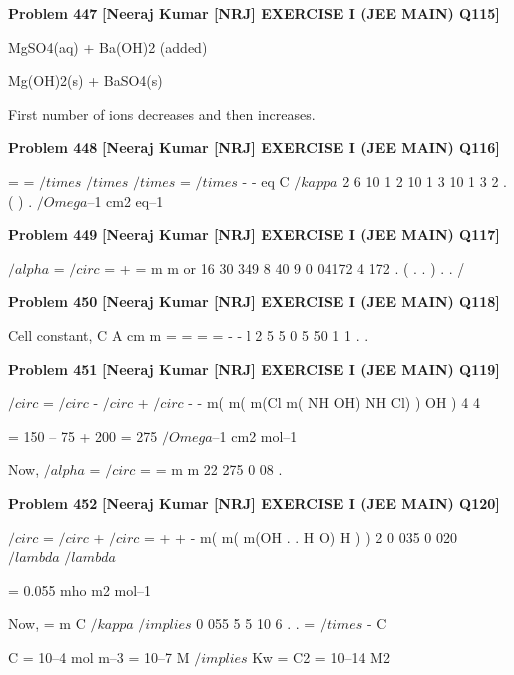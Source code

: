 \begin{problembox}
\textbf{Problem 447} \hfill \textbf{[Neeraj Kumar [NRJ] EXERCISE I (JEE MAIN) Q115]}
\label{q:ext-nrj_all_questions-447}

MgSO4(aq) + Ba(OH)2 (added) 
 
 
Mg(OH)2(s) + BaSO4(s)
 
 First number of ions decreases and then increases.
\end{problembox}

\begin{problembox}
\textbf{Problem 448} \hfill \textbf{[Neeraj Kumar [NRJ] EXERCISE I (JEE MAIN) Q116]}
\label{q:ext-nrj_all_questions-448}

 
=
=
$/times$
$/times$
$/times$
=
$/times$
-
-
eq
C
$/kappa$
2 6 10
1 2
10
1 3 10
1
3
2
.
(
)
.
 $/Omega$--1 cm2 eq--1
\end{problembox}

\begin{problembox}
\textbf{Problem 449} \hfill \textbf{[Neeraj Kumar [NRJ] EXERCISE I (JEE MAIN) Q117]}
\label{q:ext-nrj_all_questions-449}

$/alpha$ =  
 $/circ$
=
+
=
m
m
or 
16 30
349 8
40 9
0 04172
4 172
.
(
.
. )
.
.
/%
\end{problembox}

\begin{problembox}
\textbf{Problem 450} \hfill \textbf{[Neeraj Kumar [NRJ] EXERCISE I (JEE MAIN) Q118]}
\label{q:ext-nrj_all_questions-450}

Cell constant, C
A
cm
m
=
=
=
=
-
-
l
2 5
5
0 5
50
1
1
.
.
\end{problembox}

\begin{problembox}
\textbf{Problem 451} \hfill \textbf{[Neeraj Kumar [NRJ] EXERCISE I (JEE MAIN) Q119]}
\label{q:ext-nrj_all_questions-451}

 $/circ$
=  $/circ$
- $/circ$
+  $/circ$
-
-
m(
m(
m(Cl
m(
NH OH)
NH Cl)
)
OH )
4
4
 
 = 150 -- 75 + 200 = 275 $/Omega$--1 cm2 mol--1
 
 Now, $/alpha$ =  
 $/circ$
=
=
m
m
22
275
0 08
.
\end{problembox}

\begin{problembox}
\textbf{Problem 452} \hfill \textbf{[Neeraj Kumar [NRJ] EXERCISE I (JEE MAIN) Q120]}
\label{q:ext-nrj_all_questions-452}

 $/circ$
=
$/circ$
+
$/circ$
=
+
+
-
m(
m(
m(OH
.
.
H O)
H )
)
2
0 035
0 020
$/lambda$
$/lambda$
 
 = 0.055 mho m2 mol--1
 
 Now,  
=
m
C
$/kappa$ $/implies$ 0 055
5 5 10 6
.
.
=
$/times$
-
C
 
 
   C = 10--4 mol m--3 = 10--7 M $/implies$ Kw = C2 = 10--14 M2
\end{problembox}

